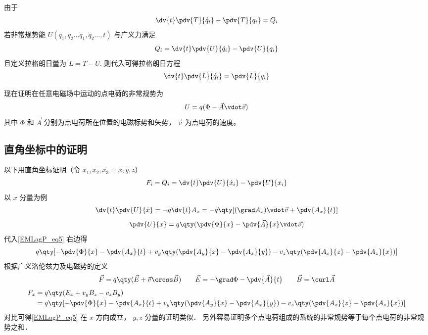
由于
\begin{equation}
\dv{t}\pdv{T}{\dot q_i} - \pdv{T}{q_i} = Q_i
\end{equation}
若非常规势能  $U(q_1, q_2...\dot q_1, \dot q_2..., t)$ 与广义力满足
\begin{equation}\label{EMLagP_eq2}
Q_i = \dv{t} \pdv{U}{\dot q_i} - \pdv{U}{q_i}
\end{equation}
且定义拉格朗日量为 $L = T - U$, 则代入可得拉格朗日方程
\begin{equation}
\dv{t} \pdv{L}{\dot q_i} = \pdv{L}{q_i}
\end{equation}

现在证明在任意电磁场中运动的点电荷的非常规势为
\begin{equation}\label{EMLagP_eq4}
U = q(\Phi  - \vec A \vdot \vec v)
\end{equation}
其中 $\Phi$ 和 $\vec A$ 分别为点电荷所在位置的电磁标势和矢势， $\vec v$ 为点电荷的速度。

\subsection{直角坐标中的证明}
以下用直角坐标证明（令 $x_1, x_2, x_3 = x,y,z$）
\begin{equation}\label{EMLagP_eq5}
F_i = Q_i =  \dv{t} \pdv{U}{\dot x_i} - \pdv{U}{x_i}
\end{equation}
以 $x$ 分量为例
\begin{equation}
\dv{t} \pdv{U}{\dot x} =  - q\dv{t} A_x =  - q\qty[ (\grad A_x) \vdot \vec v + \pdv{A_x}{t} ]
\end{equation}
\begin{equation}
\pdv{U}{x} = q\qty( \pdv{\Phi}{x} - \pdv{\vec A}{x} \vdot \vec v )
\end{equation}
代入\autoref{EMLagP_eq5} 右边得
\begin{equation}
q\qty[ -\pdv{\Phi}{x} - \pdv{A_x}{t} + v_y \qty( \pdv{A_y}{x} - \pdv{A_x}{y} ) - v_z \qty( \pdv{A_x}{z} - \pdv{A_z}{x}) ]
\end{equation} 
根据广义洛伦兹力及电磁势的定义
\begin{equation}
\vec F = q\qty(\vec E + \vec v \cross \vec B)
\qquad
\vec E =  - \grad \Phi  - \pdv{\vec A}{t}
\qquad
\vec B = \curl \vec A
\end{equation}
\begin{equation}\begin{aligned}
F_x &= q \qty(E_x + v_y B_z - v_z B_y) \\
&= q\qty[ - \pdv{\Phi}{x} - \pdv{A_x}{t} + v_y \qty(\pdv{A_y}{x} - \pdv{A_x}{y}) - v_z \qty( \pdv{A_x}{z} - \pdv{A_z}{x}) ]
\end{aligned}\end{equation}
对比可得\autoref{EMLagP_eq5} 在 $x$ 方向成立， $y,z$ 分量的证明类似． 另外容易证明多个点电荷组成的系统的非常规势等于每个点电荷的非常规势之和．

